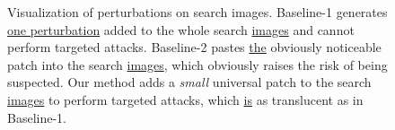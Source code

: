 \documentclass[journal]{IEEEtran}
\begin{document}
\begin{figure}[t]
  \centering
  \caption{Visualization of perturbations on search images. Baseline-1 generates \uline{one perturbation} added to the whole search \uline{images} and cannot perform targeted attacks. Baseline-2 pastes \uline{the} obviously noticeable patch into the search \uline{images}, which obviously raises the risk of being suspected. Our method adds a \textit{small} universal patch to the search \uline{images} to perform targeted attacks, which \uline{is} as translucent as in Baseline-1.}
  \label{fig:imperceptible}
  \vspace{-3mm}
\end{figure}
\end{document}
